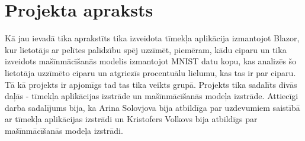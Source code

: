 \section{Projekta apraksts}

    Kā jau ievadā tika aprakstīts tika izveidota tīmekļa aplikācija izmantojot Blazor, kur lietotājs
    ar pelītes palīdzību spēj uzzīmēt, piemēram, kādu ciparu un tika izveidots mašīnmācīšanās modelis
    izmantojot MNIST datu kopu, kas analizēs šo lietotāja uzzīmēto ciparu un atgriezīs procentuālu
    lielumu, kas tas ir par ciparu. Tā kā projekts ir apjomīgs tad tas tika veikts grupā. Projekts tika
    sadalīts divās daļās - tīmekļa aplikācijas izstrāde un mašīnmācīšanās modeļa izstrāde. Attiecīgi
    darba sadalījums bija, ka Arina Solovjova bija atbildīga par uzdevumiem saistībā ar tīmekļa
    aplikācijas izstrādi un Kristofers Volkovs bija atbildīgs par mašīnmācīšanās modeļa izstrādi.

    

    
